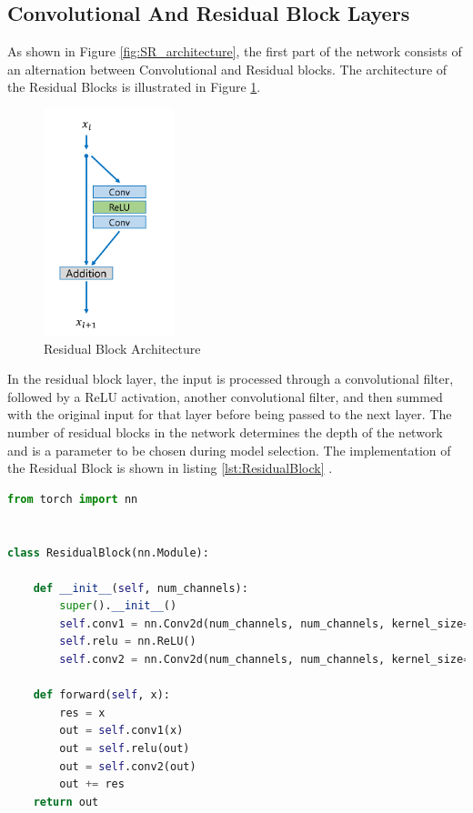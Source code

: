 \documentclass[../report.tex]{subfiles}
\begin{document}
\subsection{Convolutional And Residual Block Layers}

As shown in Figure \ref{fig:SR_architecture}, the first part of the network consists of an alternation between Convolutional and Residual blocks. The architecture of the Residual Blocks is illustrated in Figure \ref{fig:ResidualBlock_architecture}.
\begin{figure}[H]
	\caption{Residual Block Architecture}
	\centering
	\label{fig:ResidualBlock_architecture}
	\includegraphics[scale=0.5]{../images/ResidualBlock.png}
\end{figure}
In the residual block layer, the input is processed through a convolutional filter, followed by a ReLU activation, another convolutional filter, and then summed with the original input for that layer before being passed to the next layer. The number of residual blocks in the network determines the depth of the network and is a parameter to be chosen during model selection.
The implementation of the Residual Block is shown in listing \ref{lst:ResidualBlock} .

\begin{lstlisting}[style=python,language=python, label={lst:ResidualBlock},caption={Residual Block implementation}]
from torch import nn


class ResidualBlock(nn.Module):

	def __init__(self, num_channels):
		super().__init__()
		self.conv1 = nn.Conv2d(num_channels, num_channels, kernel_size=3, padding=1)
		self.relu = nn.ReLU()
		self.conv2 = nn.Conv2d(num_channels, num_channels, kernel_size=3, padding=1)
	
	def forward(self, x):
		res = x
		out = self.conv1(x)
		out = self.relu(out)
		out = self.conv2(out)
		out += res
	return out
\end{lstlisting}
\end{document}
